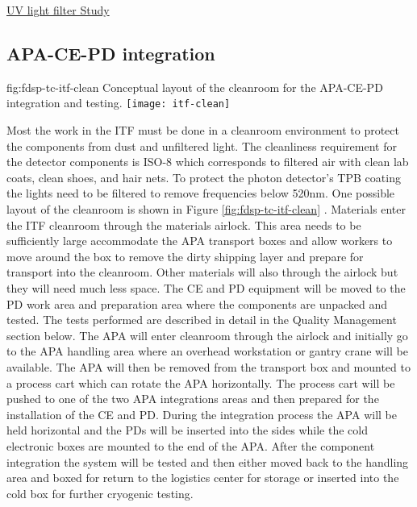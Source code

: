 \href{https://lbne2-docdb.fnal.gov/cgi-bin/private/RetrieveFile?docid=8348&filename=UVblockerTests.pdf&version=1 }{UV light filter Study}

\subsection{APA-CE-PD integration}
\label{sec:fdsp-tc-itf-integ}
\begin{dunefigure}{fig:fdsp-tc-itf-clean}
{Conceptual layout of the cleanroom for the APA-CE-PD integration and testing.}
\texttt{[image: itf-clean]}
\end{dunefigure}

Most the work in the ITF must be done in a cleanroom environment to protect the components from dust and unfiltered light. The cleanliness requirement for the detector components is ISO-8 which corresponds to filtered air with clean lab coats, clean shoes, and hair nets. To protect the photon detector's TPB coating the lights need to be filtered to remove frequencies below 520nm. One possible layout of the cleanroom is shown in Figure \ref{fig:fdsp-tc-itf-clean} . Materials enter the ITF cleanroom through the materials airlock. This area needs to be sufficiently large accommodate the APA transport boxes and allow workers to move around the box to remove the dirty shipping layer and prepare for transport into the cleanroom. Other materials will also through the airlock but they will need much less space. The CE and PD equipment will be moved to the PD work area and preparation area where the components are unpacked and tested. The tests performed are described in detail in the Quality Management section below. The APA will enter cleanroom through the airlock and initially go to the APA handling area where an overhead workstation or gantry crane will be available. The APA will then be removed from the transport box and mounted to a process cart which can rotate the APA horizontally. The process cart will be pushed to one of the two APA integrations areas and then prepared for the installation of the CE and PD. During the integration process the APA will be held horizontal and the PDs will be inserted into the sides while the cold electronic boxes are mounted to the end of the APA. After the component integration the system will be tested and then either moved back to the handling area and boxed for return to the logistics center for storage or inserted into the cold box for further cryogenic testing. 

